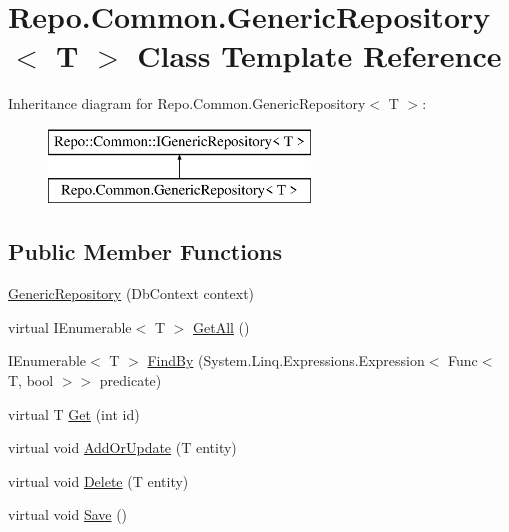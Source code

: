 \hypertarget{class_repo_1_1_common_1_1_generic_repository}{}\section{Repo.\+Common.\+Generic\+Repository$<$ T $>$ Class Template Reference}
\label{class_repo_1_1_common_1_1_generic_repository}
Inheritance diagram for Repo.\+Common.\+Generic\+Repository$<$ T $>$\+:\begin{figure}[H]
\begin{center}
\leavevmode
\includegraphics[height=2.000000cm]{class_repo_1_1_common_1_1_generic_repository}
\end{center}
\end{figure}
\subsection*{Public Member Functions}
\begin{DoxyCompactItemize}
\item 
\hyperlink{class_repo_1_1_common_1_1_generic_repository_a6ad38e9dd280fddbbf25be2e8e1bd88a}{Generic\+Repository} (Db\+Context context)
\item 
virtual I\+Enumerable$<$ T $>$ \hyperlink{class_repo_1_1_common_1_1_generic_repository_a819ba9c87b3246d17672f348c2162c7f}{Get\+All} ()
\item 
I\+Enumerable$<$ T $>$ \hyperlink{class_repo_1_1_common_1_1_generic_repository_a6126ca7ac03f92d7b51eefb2d023a151}{Find\+By} (System.\+Linq.\+Expressions.\+Expression$<$ Func$<$ T, bool $>$$>$ predicate)
\item 
virtual T \hyperlink{class_repo_1_1_common_1_1_generic_repository_ac3f609e57fb59eee8b0d8aaf2d1dd220}{Get} (int id)
\item 
virtual void \hyperlink{class_repo_1_1_common_1_1_generic_repository_a2370df477136ac65eacb282af1d00a9c}{Add\+Or\+Update} (T entity)
\item 
virtual void \hyperlink{class_repo_1_1_common_1_1_generic_repository_a9714e5c61c4f3541137bb83bebe054bb}{Delete} (T entity)
\item 
virtual void \hyperlink{class_repo_1_1_common_1_1_generic_repository_ab66ace5b2cc69867ce37dc996fc6c6e8}{Save} ()
\end{DoxyCompactItemize}
